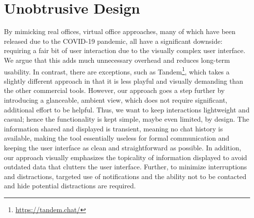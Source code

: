 \section{Unobtrusive Design}
\label{section:unobrusive_design}
By mimicking real offices, virtual office approaches, many of which have been released due to the COVID-19 pandemic, all have a significant downside: requiring a fair bit of user interaction due to the visually complex user interface. We argue that this adds much unnecessary overhead and reduces long-term usability. In contrast, there are exceptions, such as Tandem\footnote{\url{https://tandem.chat/}}, which takes a slightly different approach in that it is less playful and visually demanding than the other commercial tools. However, our approach goes a step further by introducing a glanceable, ambient view, which does not require significant, additional effort to be helpful. 
Thus, we want to keep interactions lightweight and casual; hence the functionality is kept simple, maybe even limited, by design. The information shared and displayed is transient, meaning no chat history is available, making the tool essentially useless for formal communication and keeping the user interface as clean and straightforward as possible. In addition, our approach visually emphasizes the topicality of information displayed to avoid outdated data that clutters the user interface. Further, to minimize interruptions and distractions, targeted use of notifications and the ability not to be contacted and hide potential distractions are required.
